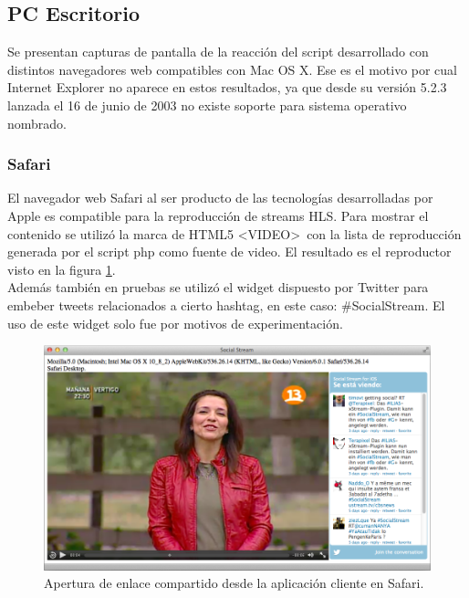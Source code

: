   \subsection{PC Escritorio}
  Se presentan capturas de pantalla de la reacción del script desarrollado con distintos navegadores web compatibles con Mac OS X. Ese es el motivo por cual Internet Explorer no aparece en estos resultados, ya que desde su versión 5.2.3 lanzada el 16 de junio de 2003 \cite{bib:mac-iexplorer} no existe soporte para sistema operativo nombrado.

    \subsubsection{Safari}
El navegador web Safari al ser producto de las tecnologías desarrolladas por Apple es compatible para la reproducción de streams HLS. Para mostrar el contenido se utilizó la marca de HTML5  \textless VIDEO\textgreater \ con la lista de reproducción generada por el script php como fuente de video. El resultado es el reproductor visto en la figura \ref{fig:uagent-safari}.\\

Además también en pruebas se utilizó el widget dispuesto por Twitter \cite{bib:twitter-widget} para embeber tweets relacionados a cierto hashtag, en este caso: \#SocialStream. El uso de este widget solo fue por motivos de experimentación.

  \begin{figure}[H]
	\centering
	\includegraphics[scale=0.4]{imgs/uagent-safari.png} 
	\caption{Apertura de enlace compartido desde la aplicación cliente en Safari.}
	\label{fig:uagent-safari}
\end{figure}  
    
